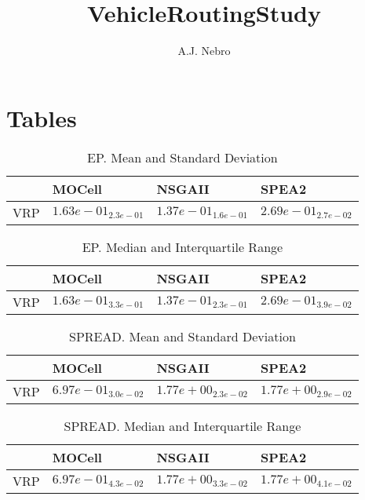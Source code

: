 \documentclass{article}
\title{VehicleRoutingStudy}
\author{A.J. Nebro}
\begin{document}
\maketitle
\section{Tables}

\begin{table}
\caption{EP. Mean and Standard Deviation}
\label{table: EP}
\centering
\begin{scriptsize}
\begin{tabular}{llll}
\hline & MOCell & NSGAII &  SPEA2\\
\hline 
VRP & \cellcolor{gray25}$  1.63e-01_{ 2.3e-01}$ & \cellcolor{gray95}$  1.37e-01_{ 1.6e-01}$ & $  2.69e-01_{ 2.7e-02}$ \\
\hline
\end{tabular}
\end{scriptsize}
\end{table}

\begin{table}
\caption{EP. Median and Interquartile Range}
\label{table: EP}
\centering
\begin{scriptsize}
\begin{tabular}{llll}
\hline & MOCell & NSGAII &  SPEA2\\
\hline 
VRP & \cellcolor{gray25}$  1.63e-01_{ 3.3e-01}$ & \cellcolor{gray95}$  1.37e-01_{ 2.3e-01}$ & $  2.69e-01_{ 3.9e-02}$ \\
\hline
\end{tabular}
\end{scriptsize}
\end{table}

\begin{table}
\caption{SPREAD. Mean and Standard Deviation}
\label{table: SPREAD}
\centering
\begin{scriptsize}
\begin{tabular}{llll}
\hline & MOCell & NSGAII &  SPEA2\\
\hline 
VRP & \cellcolor{gray95}$  6.97e-01_{ 3.0e-02}$ & $  1.77e+00_{ 2.3e-02}$ & \cellcolor{gray25}$  1.77e+00_{ 2.9e-02}$ \\
\hline
\end{tabular}
\end{scriptsize}
\end{table}

\begin{table}
\caption{SPREAD. Median and Interquartile Range}
\label{table: SPREAD}
\centering
\begin{scriptsize}
\begin{tabular}{llll}
\hline & MOCell & NSGAII &  SPEA2\\
\hline 
VRP & \cellcolor{gray95}$  6.97e-01_{ 4.3e-02}$ & $  1.77e+00_{ 3.3e-02}$ & \cellcolor{gray25}$  1.77e+00_{ 4.1e-02}$ \\
\hline
\end{tabular}
\end{scriptsize}
\end{table}
\end{document}
